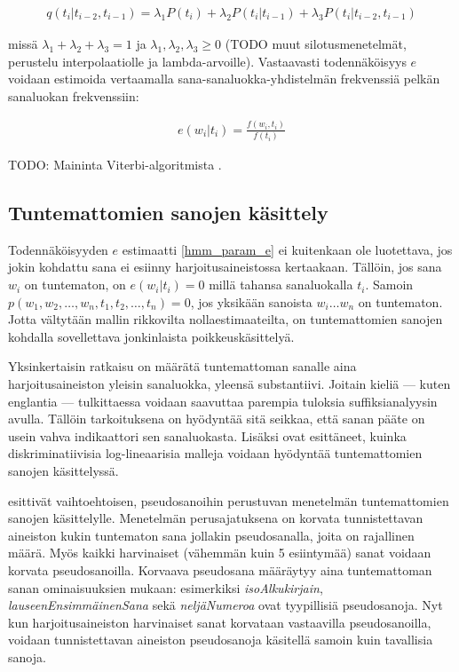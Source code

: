 \documentclass[utf8,bachelor,manualbib]{gradu3}
\begin{document}
\begin{align}
q(t_i | t_{i-2}, t_{i-1}) = \lambda_1 P(t_i) + \lambda_2 P(t_i | t_{i-1}) + \lambda_3 P(t_i | t_{i-2}, t_{i-1})
\end{align}

missä $\lambda_1+\lambda_2+\lambda_3 = 1$ ja $\lambda_1,\lambda_2,\lambda_3 \geq 0$ (TODO muut silotusmenetelmät, perustelu interpolaatiolle ja lambda-arvoille). Vastaavasti todennäköisyys $e$ voidaan estimoida vertaamalla sana-sanaluokka-yhdistelmän frekvenssiä pelkän sanaluokan frekvenssiin:

\begin{align}
e(w_i|t_i) = \frac{f(w_i, t_i)}{f(t_i)}
\label{hmm_param_e}
\end{align}

TODO: Maininta Viterbi-algoritmista \citep{viterbi1967}.

\subsection{Tuntemattomien sanojen käsittely}

Todennäköisyyden $e$ estimaatti \eqref{hmm_param_e} ei kuitenkaan ole luotettava, jos jokin kohdattu sana ei esiinny harjoitusaineistossa kertaakaan. Tällöin, jos sana $w_i$ on tuntematon, on $e(w_i|t_i)=0$ millä tahansa sanaluokalla $t_i$. Samoin $p(w_1, w_2, \ldots, w_n, t_1, t_2, \ldots, t_n) = 0$, jos yksikään sanoista $w_i \ldots w_n$ on tuntematon. Jotta vältytään mallin rikkovilta nollaestimaateilta, on tuntemattomien sanojen kohdalla sovellettava jonkinlaista poikkeuskäsittelyä.

Yksinkertaisin ratkaisu on määrätä tuntemattoman sanalle aina harjoitusaineiston yleisin sanaluokka, yleensä substantiivi. Joitain kieliä --- kuten englantia --- tulkittaessa voidaan saavuttaa parempia tuloksia suffiksianalyysin \citep{samuelsson1993} avulla. Tällöin tarkoituksena on hyödyntää sitä seikkaa, että sanan pääte on usein vahva indikaattori sen sanaluokasta. Lisäksi \citet{toutanova2003} ovat esittäneet, kuinka diskriminatiivisia log-lineaarisia malleja voidaan hyödyntää tuntemattomien sanojen käsittelyssä.

\citet{bikel1999} esittivät vaihtoehtoisen, pseudosanoihin perustuvan menetelmän tuntemattomien sanojen käsittelylle. Menetelmän perusajatuksena on korvata tunnistettavan aineiston kukin tuntematon sana jollakin pseudosanalla, joita on rajallinen määrä. Myös kaikki harvinaiset (vähemmän kuin 5 esiintymää) sanat voidaan korvata pseudosanoilla. Korvaava pseudosana määräytyy aina tuntemattoman sanan ominaisuuksien mukaan: esimerkiksi \textit{isoAlkukirjain}, \textit{lauseenEnsimmäinenSana} sekä \textit{neljäNumeroa} ovat tyypillisiä pseudosanoja. Nyt kun harjoitusaineiston harvinaiset sanat korvataan vastaavilla pseudosanoilla, voidaan tunnistettavan aineiston pseudosanoja käsitellä samoin kuin tavallisia sanoja.
\end{document}
